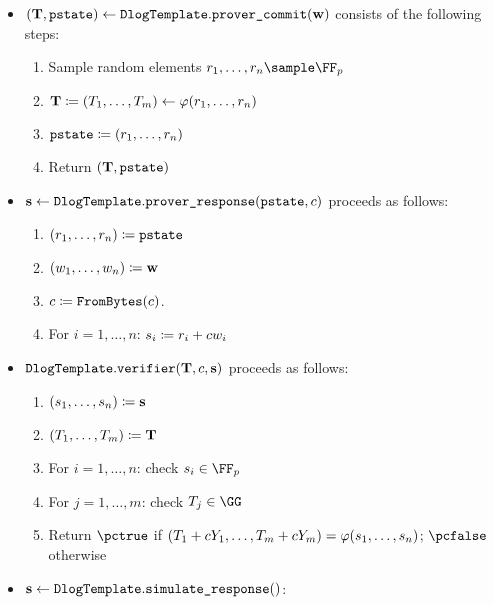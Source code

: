 \documentclass[11pt]{article}
\begin{document}
\begin{itemize}
  \item\label{item:basic:p1}
   $(\mathbf {T}, \texttt{pstate}) \gets \texttt{DlogTemplate}.\texttt{prover\_commit}(\mathbf {w})$ consists of the following steps:
    \begin{enumerate}
      \item\label{item:basic:p1:randomness}
        Sample random elements $r_1,\dots,r_n\sample\FF_p$
      \item
         $\mathbf {T} \coloneqq (T_1,\dots,T_m)\gets\varphi(r_1,\dots,r_n)$
      \item $\texttt{pstate}\coloneqq (r_1,\dots,r_n)$
      \item
        Return $(\mathbf {T},\texttt{pstate})$
    \end{enumerate}
  \item\label{item:basic:p2}
    $\mathbf {s} \gets \texttt{DlogTemplate}.\texttt{prover\_response}(\texttt{pstate},c)$ proceeds as follows:
    \begin{enumerate}
      \item  $(r_1,\dots,r_n)\coloneqq \texttt{pstate}$
      \item  $(w_1,\dots,w_n)\coloneqq \mathbf {w}$
      \item
        $c \coloneqq \texttt{FromBytes}(c)$.
      \item For $i=1,\dots,n$: $s_i\coloneqq r_i+cw_i$
    \end{enumerate}
  \item\label{item:basic:v}
     $\texttt{DlogTemplate}.\texttt{verifier}(\mathbf {T},c,\mathbf {s})$ proceeds as follows:
    \begin{enumerate}
      \item  $(s_1, \dots, s_n) \coloneqq \mathbf {s}$
      \item $(T_1, \dots, T_m) \coloneqq \mathbf {T}$
      \item\label{item:basic:v:checks}
      For $i=1,\dots,n$: check $\response_i\in\FF_p$
      \item
      For $j=1,\dots,m$: check $\commitment_j\in\GG$
      \item Return $\accept$ if $(T_1 + cY_1,\dots,T_m + cY_m) = \varphi(s_1,\dots,s_n)$; $\reject$ otherwise
    \end{enumerate}
  \item $\mathbf {s} \gets \texttt{DlogTemplate}.\texttt{simulate\_response}()$:
  \begin{enumerate}

\end{enumerate}
\end{itemize}
\end{document}
